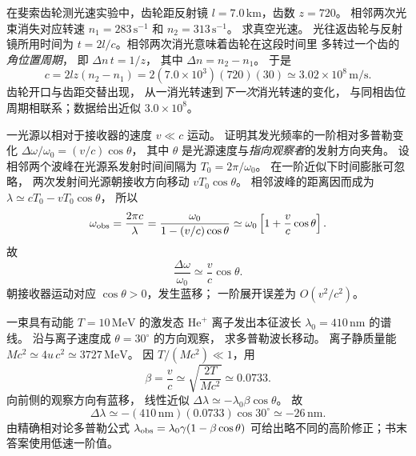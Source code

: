 

在斐索齿轮测光速实验中，齿轮距反射镜
$l=7.0\,\mathrm{km}$，齿数 $z=720$。
相邻两次光束消失对应转速
$n_1=283\,\mathrm{s^{-1}}$ 和
$n_2=313\,\mathrm{s^{-1}}$。
求真空光速。
\exsolution
光往返齿轮与反射镜所用时间为
$t=2l/c$。相邻两次消光意味着齿轮在这段时间里
多转过一个齿的\emph{角位置周期}，
即 $\Delta n\,t=1/z$，
其中 $\Delta n=n_2-n_1$。
于是
\[
 \boxed{c=2lz(n_2-n_1)
 =2(7.0\times10^3)(720)(30)
 \simeq3.02\times10^8\,\mathrm{m/s}}.
\]
\excheck 齿轮开口与齿距交替出现，
从一消光转速到\emph{下一次}消光转速的变化，
与同相齿位周期相联系；数据给出近似 $3.0\times10^8$。

一光源以相对于接收器的速度 $v\ll c$ 运动。
证明其发光频率的一阶相对多普勒变化
$\Delta\omega/\omega_0=(v/c)\cos\theta$，
其中 $\theta$ 是光源速度与\emph{指向观察者}的发射方向夹角。
\exsolution
设相邻两个波峰在光源系发射时间间隔为
$T_0=2\pi/\omega_0$。
在一阶近似下时间膨胀可忽略，
两次发射间光源朝接收方向移动
$vT_0\cos\theta$。
相邻波峰的距离因而成为
$\lambda\simeq cT_0-vT_0\cos\theta$，
所以
\[
 \omega_{\rm obs}=\frac{2\pi c}{\lambda}
 =\frac{\omega_0}{1-(v/c)\cos\theta}
 \simeq\omega_0\left[1+\frac vc\cos\theta\right].
\]
故
\[
 \boxed{\frac{\Delta\omega}{\omega_0}
 \simeq\frac vc\cos\theta}.
\]
\excheck 朝接收器运动对应 $\cos\theta>0$，发生蓝移；
一阶展开误差为 $O(v^2/c^2)$。

一束具有动能 $T=10\,\mathrm{MeV}$ 的激发态
$\mathrm{He}^+$ 离子发出本征波长
$\lambda_0=410\,\mathrm{nm}$ 的谱线。
沿与离子速度成 $\theta=30^\circ$ 的方向观察，
求多普勒波长移动。
\exsolution
离子静质量能
$Mc^2\simeq4u\,c^2\simeq3727\,\mathrm{MeV}$。
因 $T/(Mc^2)\ll1$，用
\[
 \beta=\frac vc\simeq\sqrt{\frac{2T}{Mc^2}}
 \simeq0.0733.
\]
向前侧的观察方向有蓝移，
线性近似
$\Delta\lambda\simeq-\lambda_0\beta\cos\theta$。
故
\[
 \boxed{\Delta\lambda\simeq
 -(410\,\mathrm{nm})(0.0733)\cos30^\circ
 \simeq-26\,\mathrm{nm}}.
\]
\excheck 由精确相对论多普勒公式
$\lambda_{\rm obs}=\lambda_0\gamma(1-\beta\cos\theta)$
可给出略不同的高阶修正；书末答案使用低速一阶值。

